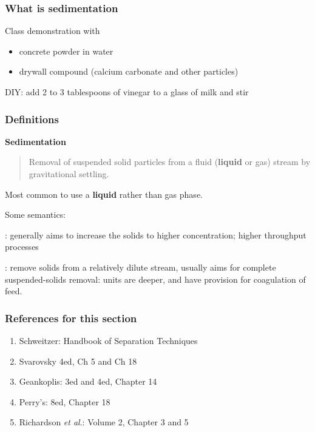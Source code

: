 
	
	
\begin{frame}\frametitle{What is sedimentation}
	Class demonstration with
	\begin{itemize}
		\item	concrete powder in water
		\item	drywall compound (calcium carbonate and other particles)
	\end{itemize}

	\vspace{12pt}
	DIY: add 2 to 3 tablespoons of vinegar to a glass of milk and stir	
\end{frame}

\begin{frame}\frametitle{Definitions}	
	\textbf{Sedimentation}
	\begin{quote}	
		Removal of suspended solid particles from a fluid (\textbf{liquid} or gas) stream by gravitational settling.
	\end{quote}
	Most common to use a \textbf{liquid} rather than gas phase.

	\vspace{12pt}
	Some semantics:
	
	\vspace{12pt}	
	{\color{myGreen}{Thickening}}: generally aims to increase the solids to higher concentration; higher throughput processes

	\vspace{12pt}
	{\color{myGreen}{Clarification}}: remove solids from a relatively dilute stream, usually aims for complete suspended-solids removal: units are deeper, and have provision for coagulation of feed.
	
\end{frame}

\begin{frame}\frametitle{References for this section}
	\begin{enumerate}
		\item	Schweitzer: Handbook of Separation Techniques
		\item	Svarovsky 4ed, Ch 5 and Ch 18
		\item	Geankoplis: 3ed and 4ed, Chapter 14
		\item	Perry's: 8ed, Chapter 18
		\item	Richardson \emph{et al}.: Volume 2, Chapter 3 and 5		
	\end{enumerate}
\end{frame}

